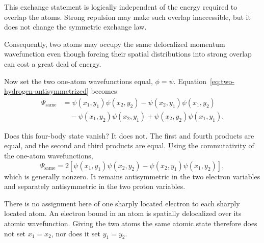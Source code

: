This exchange statement is logically independent of the energy required to overlap the atoms. Strong repulsion may make such overlap inaccessible, but it does not change the symmetric exchange law.

\begin{classroomqa}
\end{classroomqa}

Consequently, two atoms may occupy the same delocalized momentum wavefunction even though forcing their spatial distributions into strong overlap can cost a great deal of energy.

Now set the two one-atom wavefunctions equal, \(\phi=\psi\). Equation~\eqref{eq:two-hydrogen-antisymmetrized} becomes
\begin{align}
\Psi_{\mathrm{same}}
&=\psi(x_1,y_1)\psi(x_2,y_2)
-\psi(x_2,y_1)\psi(x_1,y_2)\nonumber\\
&\quad
-\psi(x_1,y_2)\psi(x_2,y_1)
+\psi(x_2,y_2)\psi(x_1,y_1).
\end{align}

Does this four-body state vanish? It does not. The first and fourth products are equal, and the second and third products are equal. Using the commutativity of the one-atom wavefunctions,
\begin{equation}
\Psi_{\mathrm{same}}
=
2\left[
\psi(x_1,y_1)\psi(x_2,y_2)
-\psi(x_2,y_1)\psi(x_1,y_2)
\right],
\label{eq:same-hydrogen-state}
\end{equation}
which is generally nonzero. It remains antisymmetric in the two electron variables and separately antisymmetric in the two proton variables.

There is no assignment here of one sharply located electron to each sharply located atom. An electron bound in an atom is spatially delocalized over its atomic wavefunction. Giving the two atoms the same atomic state therefore does not set \(x_1=x_2\), nor does it set \(y_1=y_2\).

